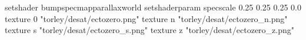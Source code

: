 setshader bumpspecmapparallaxworld
setshaderparam specscale 0.25 0.25 0.25 0.0
texture 0 "torley/desat/ectozero.png"
texture n "torley/desat/ectozero_n.png"
texture s "torley/desat/ectozero_s.png"
texture z "torley/desat/ectozero_z.png"

